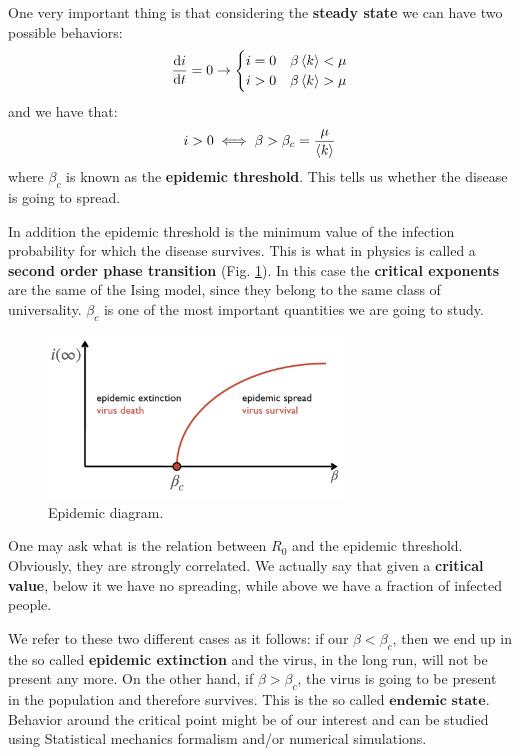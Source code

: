 \documentclass[../main/main.tex]{subfiles}
\begin{document}
One very important thing is that considering the \textbf{steady state} we can have two possible behaviors:
\begin{equation*}
  \dv{i}{t} = 0 \rightarrow  \begin{cases}
   i=0 & \beta \expval{k} < \mu  \\
   i>0 & \beta \expval{k} > \mu
  \end{cases}
\end{equation*}
and we have that:
\begin{equation}
  i>0 \iff \beta > \beta_c = \frac{\mu }{ \expval{k} }
\end{equation}
where $\beta_c$ is known as the \textbf{epidemic threshold}. This tells us whether the disease is going to spread.

In addition the epidemic threshold is the minimum value of the infection probability for which the disease survives. This is what in physics is called a \textbf{second order phase transition} (Fig. \ref{fig:3_5}). In this case the \textbf{critical exponents} are the same of the Ising model, since they belong to the same class of universality. $\beta_c$ is one of the most important quantities we are going to study.

\begin{figure}[h!]
\centering
\includegraphics[width=0.7\textwidth]{../lessons/image/03/5.png}
\caption{\label{fig:3_5} Epidemic diagram.}
\end{figure}

One may ask what is the relation between \( R_0 \) and the epidemic threshold. Obviously, they are strongly correlated. We actually say that given a \textbf{critical value}, below it we have no spreading, while above we have a fraction of infected people.

We refer to these two different cases as it follows: if our $\beta < \beta_c$, then we end up in the so called \textbf{epidemic extinction} and the virus, in the long run, will not be present any more. On the other hand, if $\beta > \beta_c$, the virus is going to be present in the population and therefore survives. This is the so called $\textbf{endemic state}$. Behavior around the critical point might be of our interest and can be studied using Statistical mechanics formalism and/or numerical simulations. 
\end{document}
